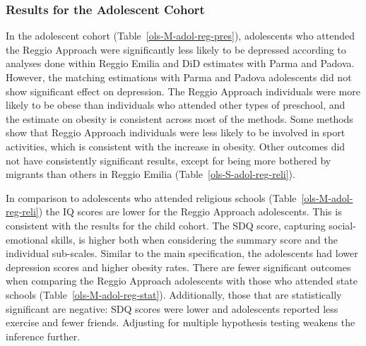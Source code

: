 \subsubsection{Results for the Adolescent Cohort}
In the adolescent cohort (Table~\ref{ols-M-adol-reg-pres}), adolescents who attended the Reggio Approach were significantly less likely to be depressed according to analyses done within Reggio Emilia and DiD estimates with Parma and Padova. However, the matching estimations with Parma and Padova adolescents did not show significant effect on depression. The Reggio Approach individuals were more likely to be obese than individuals who attended other types of preschool, and the estimate on obesity is consistent across most of the methods. Some methods show that Reggio Approach individuals were less likely to be involved in sport activities, which is consistent with the increase in obesity. Other outcomes did not have consistently significant results, except for being more bothered by migrants than others in Reggio Emilia (Table~\ref{ols-S-adol-reg-reli}).

In comparison to adolescents who attended religious schools (Table~\ref{ols-M-adol-reg-reli}) the IQ scores are lower for the Reggio Approach adolescents. This is consistent with the results for the child cohort. The SDQ score, capturing social-emotional skills, is higher both when considering the summary score and the individual sub-scales. Similar to the main specification, the adolescents had lower depression scores and higher obesity rates. There are fewer significant outcomes when comparing the Reggio Approach adolescents with those who attended state schools (Table~\ref{ols-M-adol-reg-stat}). Additionally, those that are statistically significant are negative: SDQ scores were lower and adolescents reported less exercise and fewer friends. Adjusting for multiple hypothesis testing weakens the inference further.



